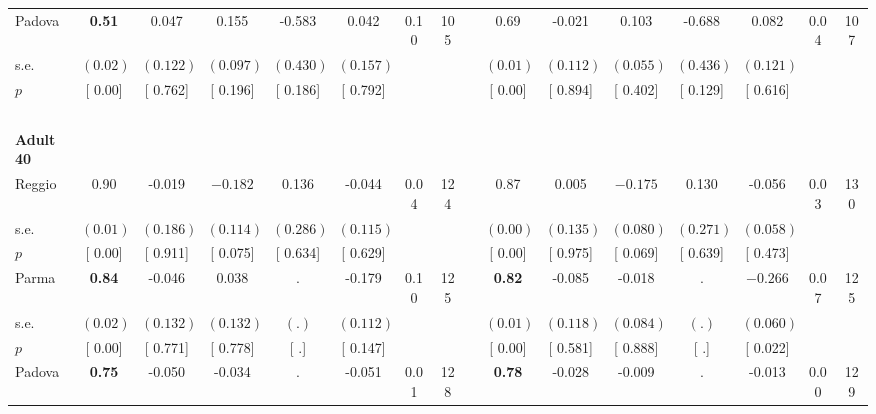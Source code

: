 \begin{longtable}{L{8em} c c c c c c c p{1em} c c c c c c c}
\quad \quad \quad Padova& \textbf{     0.51} &     0.047 &     0.155 &    -0.583 &     0.042 &      0.10 &       105 & & 0.69 &    -0.021 &     0.103 &    -0.688 &     0.082 &      0.04 &       107  \\*
\quad \quad \quad \quad s.e.& $ (     0.02)$ & $ (    0.122)$ & $ (    0.097)$ & $ (    0.430)$ & $ (    0.157)$ & & & & $ (     0.01)$ & $ (    0.112)$ & $ (    0.055)$ & $ (    0.436)$ & $ (    0.121)$ & &  \\*
\quad \quad \quad \quad $ p$ & [     0.00] & [    0.762] & [    0.196] & [    0.186] & [    0.792] & & & & [     0.00] & [    0.894] & [    0.402] & [    0.129] & [    0.616] & &  \\[1em]
~\\[1em]
\quad \quad \textbf{Adult 40} & & & & & & & & & & & & & & & \\* 
\quad \quad \quad Reggio& 0.90 &    -0.019 & $ \mathbf{   -0.182}$ &     0.136 &    -0.044 &      0.04 &       124 & & 0.87 &     0.005 & $ \mathbf{   -0.175}$ &     0.130 &    -0.056 &      0.03 &       130  \\*
\quad \quad \quad \quad s.e.& $ (     0.01)$ & $ (    0.186)$ & $ (    0.114)$ & $ (    0.286)$ & $ (    0.115)$ & & & & $ (     0.00)$ & $ (    0.135)$ & $ (    0.080)$ & $ (    0.271)$ & $ (    0.058)$ & &  \\*
\quad \quad \quad \quad $ p$ & [     0.00] & [    0.911] & [    0.075] & [    0.634] & [    0.629] & & & & [     0.00] & [    0.975] & [    0.069] & [    0.639] & [    0.473] & &  \\[1em]
\quad \quad \quad Parma& \textbf{     0.84} &    -0.046 &     0.038 &         . &    -0.179 &      0.10 &       125 & & \textbf{     0.82} &    -0.085 &    -0.018 &         . & $ \mathbf{   -0.266}$ &      0.07 &       125  \\*
\quad \quad \quad \quad s.e.& $ (     0.02)$ & $ (    0.132)$ & $ (    0.132)$ & $ (        .)$ & $ (    0.112)$ & & & & $ (     0.01)$ & $ (    0.118)$ & $ (    0.084)$ & $ (        .)$ & $ (    0.060)$ & &  \\*
\quad \quad \quad \quad $ p$ & [     0.00] & [    0.771] & [    0.778] & [        .] & [    0.147] & & & & [     0.00] & [    0.581] & [    0.888] & [        .] & [    0.022] & &  \\[1em]
\quad \quad \quad Padova& \textbf{     0.75} &    -0.050 &    -0.034 &         . &    -0.051 &      0.01 &       128 & & \textbf{     0.78} &    -0.028 &    -0.009 &         . &    -0.013 &      0.00 &       129  \\*

\end{longtable}
